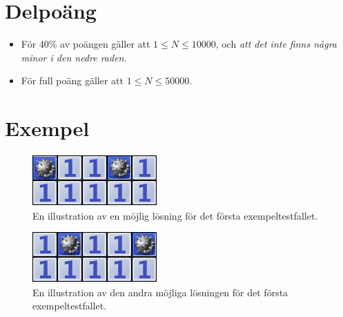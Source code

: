 \section*{Delpoäng}
\begin{itemize}
\item För 40\% av poängen gäller att $1 \leq N \leq 10 000$, och \emph{att det inte finns några minor i den nedre raden}.
\item För full poäng gäller att $1 \leq N \leq 50 000$.
\end{itemize}

\section*{Exempel}

\begin{figure}[h!]
\begin{center}
\includegraphics[scale=1]{miniroj1}
\end{center}
\caption{En illustration av en möjlig lösning för det första exempeltestfallet.}
\label{fig1}
\end{figure}

\begin{figure}[h!]
\begin{center}
\includegraphics[scale=1]{miniroj2}
\end{center}
\caption{En illustration av den andra möjliga lösningen för det första exempeltestfallet.}
\label{fig1}
\end{figure}
